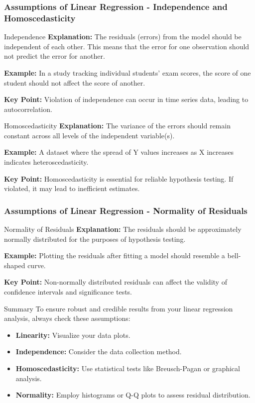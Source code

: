 \documentclass{beamer}
\begin{document}
\begin{frame}[fragile]
    \frametitle{Assumptions of Linear Regression - Independence and Homoscedasticity}
    \begin{block}{Independence}
        \textbf{Explanation:} The residuals (errors) from the model should be independent of each other.
        This means that the error for one observation should not predict the error for another.
        
        \textbf{Example:} In a study tracking individual students' exam scores, the score of one student should not affect the score of another.
        
        \textbf{Key Point:} Violation of independence can occur in time series data, leading to autocorrelation.
    \end{block}
    
    \begin{block}{Homoscedasticity}
        \textbf{Explanation:} The variance of the errors should remain constant across all levels of the independent variable(s).
        
        \textbf{Example:} A dataset where the spread of Y values increases as X increases indicates heteroscedasticity.
        
        \textbf{Key Point:} Homoscedasticity is essential for reliable hypothesis testing. If violated, it may lead to inefficient estimates.
    \end{block}
\end{frame}

\begin{frame}[fragile]
    \frametitle{Assumptions of Linear Regression - Normality of Residuals}
    \begin{block}{Normality of Residuals}
        \textbf{Explanation:} The residuals should be approximately normally distributed for the purposes of hypothesis testing.
        
        \textbf{Example:} Plotting the residuals after fitting a model should resemble a bell-shaped curve.
        
        \textbf{Key Point:} Non-normally distributed residuals can affect the validity of confidence intervals and significance tests.
    \end{block}
    
    \begin{block}{Summary}
        To ensure robust and credible results from your linear regression analysis, always check these assumptions:
        \begin{itemize}
            \item \textbf{Linearity:} Visualize your data plots.
            \item \textbf{Independence:} Consider the data collection method.
            \item \textbf{Homoscedasticity:} Use statistical tests like Breusch-Pagan or graphical analysis.
            \item \textbf{Normality:} Employ histograms or Q-Q plots to assess residual distribution.
        \end{itemize}
    \end{block}
\end{frame}
\end{document}
